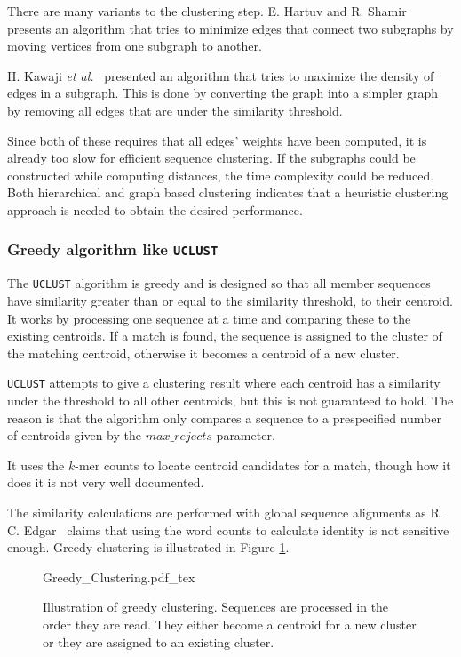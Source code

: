 There are many variants to the clustering step. E. Hartuv and R. Shamir \\
\cite{hartuv} presents an algorithm that tries to minimize edges that
connect two subgraphs by moving vertices from one subgraph to another.

H. Kawaji \textit{et al.}~\cite{kawaji} presented an algorithm that tries to
maximize the density of edges in a subgraph. This is done by converting the
graph into a simpler graph by removing all edges that are under the similarity
threshold.

Since both of these requires that all edges' weights have been computed, it is
already too slow for efficient sequence clustering. If the subgraphs could be
constructed while computing distances, the time complexity could be reduced.
Both hierarchical and graph based clustering indicates that a heuristic
clustering approach is needed to obtain the desired performance.


\subsubsection{Greedy algorithm like \texttt{UCLUST}}

The \texttt{UCLUST} algorithm is greedy and is designed so that all member
sequences have similarity greater than or equal to the similarity threshold,
to their centroid.  It works by processing one sequence at a time and
comparing these to the existing centroids. If a match is found, the sequence
is assigned to the cluster of the matching centroid, otherwise it becomes a
centroid of a new cluster.

\texttt{UCLUST} attempts to give a clustering result where each centroid has a
similarity under the threshold to all other centroids, but this is not
guaranteed to hold. The reason is that the algorithm only compares a sequence
to a prespecified number of centroids given by the $max\_rejects$ parameter.

It uses the $k$-mer counts to locate centroid candidates for a match, though
how it does it is not very well documented.

The similarity calculations are performed with global sequence alignments as R.
C. Edgar~\cite{usearch_algorithm}  claims that using the word counts to
calculate identity is not sensitive enough. Greedy clustering is illustrated in
Figure \ref{fig:greedy_clustering}.

\begin{figure}[H]
  \def\svgwidth{\columnwidth}
  {Greedy_Clustering.pdf_tex}
  \caption{Illustration of greedy clustering. Sequences are processed in the
    order they are read. They either become a centroid for a new cluster or
    they are assigned to an existing cluster.}
  \label{fig:greedy_clustering}
\end{figure}

